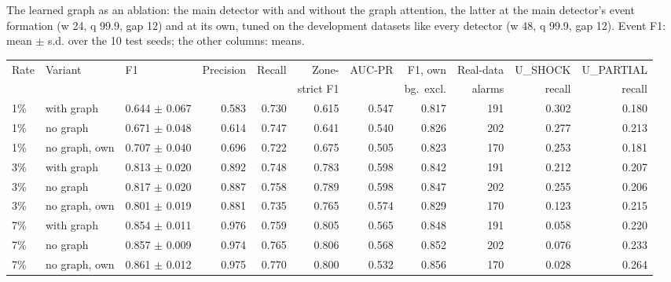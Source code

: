 \documentclass[11pt,a4paper]{article}
\makeatletter
\newenvironment{stable}{\par\addvspace{8pt}\noindent\begin{minipage}{\textwidth}\def\@captype{table}\centering}{\end{minipage}\par\addvspace{8pt}}
\makeatother
\begin{document}
\begin{stable}
\caption{The learned graph as an ablation: the main detector with and without the graph attention, the latter at the main detector's event formation (w 24, q 99.9, gap 12) and at its own, tuned on the development datasets like every detector (w 48, q 99.9, gap 12). Event F1: mean $\pm$ s.d. over the 10 test seeds; the other columns: means.}\label{tab:s-graph}
\scriptsize\setlength{\tabcolsep}{2.2pt}
\begin{tabular}{@{}l l l r r r r r r r r@{}}
\toprule
Rate & Variant & F1 & Precision & Recall & Zone- & AUC-PR & F1, own & Real-data & U\_SHOCK & U\_PARTIAL \\
 & & & & & strict F1 & & bg.\ excl. & alarms & recall & recall \\
\midrule
1\% & with graph & 0.644 $\pm$ 0.067 & 0.583 & 0.730 & 0.615 & 0.547 & 0.817 & 191 & 0.302 & 0.180 \\
1\% & no graph & 0.671 $\pm$ 0.048 & 0.614 & 0.747 & 0.641 & 0.540 & 0.826 & 202 & 0.277 & 0.213 \\
1\% & no graph, own & 0.707 $\pm$ 0.040 & 0.696 & 0.722 & 0.675 & 0.505 & 0.823 & 170 & 0.253 & 0.181 \\
\midrule
3\% & with graph & 0.813 $\pm$ 0.020 & 0.892 & 0.748 & 0.783 & 0.598 & 0.842 & 191 & 0.212 & 0.207 \\
3\% & no graph & 0.817 $\pm$ 0.020 & 0.887 & 0.758 & 0.789 & 0.598 & 0.847 & 202 & 0.255 & 0.206 \\
3\% & no graph, own & 0.801 $\pm$ 0.019 & 0.881 & 0.735 & 0.765 & 0.574 & 0.829 & 170 & 0.123 & 0.215 \\
\midrule
7\% & with graph & 0.854 $\pm$ 0.011 & 0.976 & 0.759 & 0.805 & 0.565 & 0.848 & 191 & 0.058 & 0.220 \\
7\% & no graph & 0.857 $\pm$ 0.009 & 0.974 & 0.765 & 0.806 & 0.568 & 0.852 & 202 & 0.076 & 0.233 \\
7\% & no graph, own & 0.861 $\pm$ 0.012 & 0.975 & 0.770 & 0.800 & 0.532 & 0.856 & 170 & 0.028 & 0.264 \\
\bottomrule
\end{tabular}
\end{stable}
\end{document}
